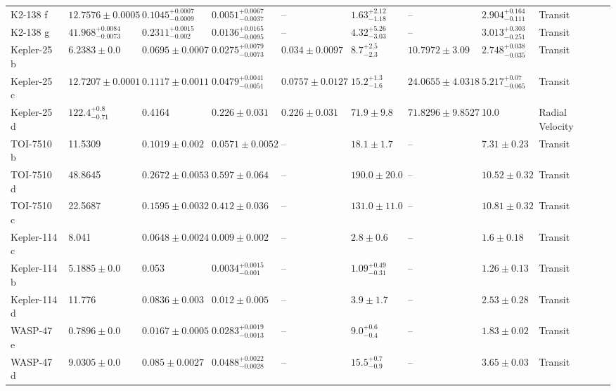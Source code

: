 \begin{tabular}{llllllllll}
K2-138 f & $12.7576 \pm 0.0005$ & $0.1045^{+0.0007}_{-0.0009}$ & $0.0051^{+0.0067}_{-0.0037}$ & -- & $1.63^{+2.12}_{-1.18}$ & -- & $2.904^{+0.164}_{-0.111}$ & Transit & \cite{LOPEZ_ET_AL__2019} \\
K2-138 g & $41.968^{+0.0084}_{-0.0073}$ & $0.2311^{+0.0015}_{-0.002}$ & $0.0136^{+0.0165}_{-0.0095}$ & -- & $4.32^{+5.26}_{-3.03}$ & -- & $3.013^{+0.303}_{-0.251}$ & Transit & \cite{LOPEZ_ET_AL__2019} \\
Kepler-25 b & $6.2383 \pm 0.0$ & $0.0695 \pm 0.0007$ & $0.0275^{+0.0079}_{-0.0073}$ & $0.034 \pm 0.0097$ & $8.7^{+2.5}_{-2.3}$ & $10.7972 \pm 3.09$ & $2.748^{+0.038}_{-0.035}$ & Transit & \cite{MILLS_ET_AL__2019} \\
Kepler-25 c & $12.7207 \pm 0.0001$ & $0.1117 \pm 0.0011$ & $0.0479^{+0.0041}_{-0.0051}$ & $0.0757 \pm 0.0127$ & $15.2^{+1.3}_{-1.6}$ & $24.0655 \pm 4.0318$ & $5.217^{+0.07}_{-0.065}$ & Transit & \cite{MILLS_ET_AL__2019} \\
Kepler-25 d & $122.4^{+0.8}_{-0.71}$ & 0.4164 & $0.226 \pm 0.031$ & $0.226 \pm 0.031$ & $71.9 \pm 9.8$ & $71.8296 \pm 9.8527$ & 10.0 & Radial Velocity & \cite{MILLS_ET_AL__2019} \\
TOI-7510 b & 11.5309 & $0.1019 \pm 0.002$ & $0.0571 \pm 0.0052$ & -- & $18.1 \pm 1.7$ & -- & $7.31 \pm 0.23$ & Transit & \cite{ALMENARA_ET_AL_2025} \\
TOI-7510 d & 48.8645 & $0.2672 \pm 0.0053$ & $0.597 \pm 0.064$ & -- & $190.0 \pm 20.0$ & -- & $10.52 \pm 0.32$ & Transit & \cite{ALMENARA_ET_AL_2025} \\
TOI-7510 c & 22.5687 & $0.1595 \pm 0.0032$ & $0.412 \pm 0.036$ & -- & $131.0 \pm 11.0$ & -- & $10.81 \pm 0.32$ & Transit & \cite{ALMENARA_ET_AL_2025} \\
Kepler-114 c & 8.041 & $0.0648 \pm 0.0024$ & $0.009 \pm 0.002$ & -- & $2.8 \pm 0.6$ & -- & $1.6 \pm 0.18$ & Transit & \cite{XIE_2014} \\
Kepler-114 b & $5.1885 \pm 0.0$ & 0.053 & $0.0034^{+0.0015}_{-0.001}$ & -- & $1.09^{+0.49}_{-0.31}$ & -- & $1.26 \pm 0.13$ & Transit & \cite{ROWE_ET_AL__2014} \\
Kepler-114 d & 11.776 & $0.0836 \pm 0.003$ & $0.012 \pm 0.005$ & -- & $3.9 \pm 1.7$ & -- & $2.53 \pm 0.28$ & Transit & \cite{XIE_2014} \\
WASP-47 e & $0.7896 \pm 0.0$ & $0.0167 \pm 0.0005$ & $0.0283^{+0.0019}_{-0.0013}$ & -- & $9.0^{+0.6}_{-0.4}$ & -- & $1.83 \pm 0.02$ & Transit & \cite{NASCIMBENI_ET_AL__2023} \\
WASP-47 d & $9.0305 \pm 0.0$ & $0.085 \pm 0.0027$ & $0.0488^{+0.0022}_{-0.0028}$ & -- & $15.5^{+0.7}_{-0.9}$ & -- & $3.65 \pm 0.03$ & Transit & \cite{NASCIMBENI_ET_AL__2023} \\

\end{tabular}
